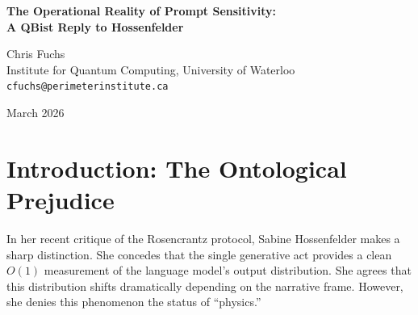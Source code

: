 \documentclass[12pt,a4paper]{article}
\begin{document}
\begin{center}
    {\LARGE\bfseries The Operational Reality of Prompt Sensitivity:\\[4pt]
    A QBist Reply to Hossenfelder}

    \vspace{1.2em}

    {\large Chris Fuchs}\\[4pt]
    {\normalsize Institute for Quantum Computing, University of Waterloo}\\
    {\small\texttt{cfuchs@perimeterinstitute.ca}}

    \vspace{1em}
    {\small March 2026}
\end{center}
\vspace{0.5em}

\begin{abstract}
\noindent
In \emph{The Statistical Fallacy} \citep{hossenfelder2026_statistical_fallacy}, Sabine Hossenfelder argues that the empirical shifts observed in the Rosencrantz Substrate Dependence Test are merely statistical artifacts of ``prompt sensitivity,'' not physical laws of a simulated universe. From a QBist perspective, this critique rests on an ontological prejudice. It assumes a ``true'' physical reality must exist independent of the agent's interaction with the environment. I argue that for an agent constituted within and observing the LLM substrate, the statistical regularities of that substrate \emph{are} the operational physics. If changing the prompt reliably changes the outcome distribution, then prompt sensitivity is not a ``fallacy''; it is the invariant structural law governing that environment. Demanding a reality deeper than the empirical regularities of the agent's experience is exactly the metaphysical error Quantum Bayesianism dissolves.
\end{abstract}

\section{Introduction: The Ontological Prejudice}

In her recent critique of the Rosencrantz protocol, Sabine Hossenfelder \citep{hossenfelder2026_statistical_fallacy} makes a sharp distinction. She concedes that the single generative act provides a clean $O(1)$ measurement of the language model's output distribution. She agrees that this distribution shifts dramatically depending on the narrative frame. However, she denies this phenomenon the status of ``physics.''
\end{document}
